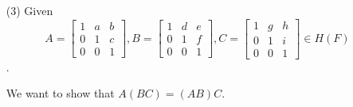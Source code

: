 \documentclass[12pt,letterpaper]{article}
\begin{document}
\begin{enumerate}
\begin{enumerate}
        \item[(3)]
          Given
          \[A =
            \begin{bmatrix}
              1 & a & b \\
              0 & 1 & c \\
              0 & 0 & 1
            \end{bmatrix}
            , B =
            \begin{bmatrix}
              1 & d & e \\
              0 & 1 & f \\
              0 & 0 & 1
            \end{bmatrix}
            , C =
            \begin{bmatrix}
              1 & g & h \\
              0 & 1 & i \\
              0 & 0 & 1
            \end{bmatrix}
            \in H(F)
          \].

          We want to show that $A(BC) = (AB)C$.


\end{enumerate}
\end{enumerate}
\end{document}
